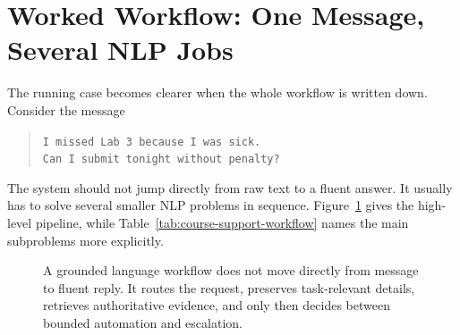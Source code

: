 \section{Worked Workflow: One Message, Several NLP Jobs}

The running case becomes clearer when the whole workflow is written down. Consider the message
\begin{quote}
\texttt{I missed Lab 3 because I was sick.\\ Can I submit tonight without penalty?}
\end{quote}
The system should not jump directly from raw text to a fluent answer. It usually has to solve several smaller NLP problems in sequence. Figure~\ref{fig:course-support-pipeline} gives the high-level pipeline, while Table~\ref{tab:course-support-workflow} names the main subproblems more explicitly.

\begin{figure}[t]
\centering
{}
\caption{A grounded language workflow does not move directly from message to fluent reply. It routes the request, preserves task-relevant details, retrieves authoritative evidence, and only then decides between bounded automation and escalation.}
\label{fig:course-support-pipeline}
\end{figure}

